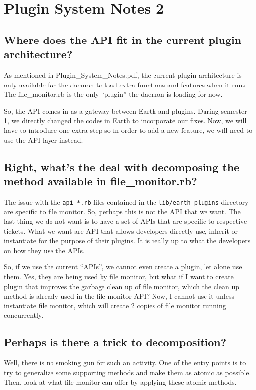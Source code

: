 \documentclass{article}
\begin{document}
\section*{Plugin System Notes 2}

\subsection*{Where does the API fit in the current plugin architecture?}

As mentioned in Plugin\_System\_Notes.pdf, the current plugin architecture is only available for the daemon to load extra functions and features when it runs. The file\_monitor.rb is the only ``plugin'' the daemon is loading for now. 

So, the API comes in as a gateway between Earth and plugins. During semester 1, we directly changed the codes in Earth to incorporate our fixes. Now, we will have to introduce one extra step so in order to add a new feature, we will need to use the API layer instead. 

\subsection*{Right, what's the deal with decomposing the method available in file\_monitor.rb?}

The issue with the \texttt{api\_*.rb} files contained in the \texttt{lib/earth\_plugins} directory are specific to file monitor. So, perhaps this is not the API that we want. The last thing we do not want is to have a set of APIs that are specific to respective tickets. What we want are API that allows developers directly use, inherit or instantiate for the purpose of their plugins. It is really up to what the developers on how they use the APIs. 

So, if we use the current ``APIs'', we cannot even create a plugin, let alone use them. Yes, they are being used by file monitor, but what if I want to create plugin that improves the garbage clean up of file monitor, which the clean up method is already used in the file monitor API? Now, I cannot use it unless instantiate file monitor, which will create 2 copies of file monitor running concurrently. 

\subsection*{Perhaps is there a trick to decomposition?}

Well, there is no smoking gun for such an activity. One of the entry points is to try to generalize some supporting methods and make them as atomic as possible. Then, look at what file monitor can offer by applying these atomic methods. 
\end{document}
